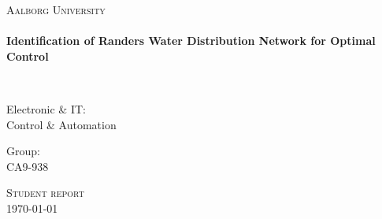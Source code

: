 \thispagestyle{empty}

\begin{center}

\vspace*{\fill}

\textsc{\LARGE Aalborg University}\\[1.0cm]

\HRule \\[0.2cm]
{ \LARGE \bfseries  Identification of Randers Water Distribution Network for Optimal Control \\[0.2cm] }

\HRule \\[1.5cm]%

\begin{minipage}{0.4\textwidth}
\begin{flushleft} \large
Electronic \& IT:\\
Control \& Automation
\end{flushleft}
\end{minipage}
\begin{minipage}{0.4\textwidth}
\begin{flushright} \large
Group: \\
CA9-938
\end{flushright}
\end{minipage}

\vspace*{\fill}

\textsc{\Large Student report}\\[1.0cm]

{\large \today}

\end{center}